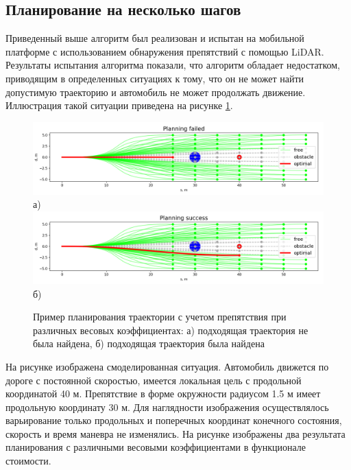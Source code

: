 \subsection{Планирование на несколько шагов}

Приведенный выше алгоритм был реализован и испытан на мобильной платформе с использованием обнаружения препятствий с
помощью LiDAR. Результаты испытания алгоритма показали, что алгоритм обладает недостатком, приводящим в определенных
ситуациях к тому, что он не может найти допустимую траекторию и автомобиль не может продолжать движение. Иллюстрация
такой ситуации приведена на рисунке \ref{img:quintic_planning_failed}.

\begin{figure}[h]
      \centering
      \includegraphics[width=\linewidth]{images/quintic_planning_failed} \\ а)
      \includegraphics[width=\linewidth]{images/quintic_planning_success} \\ б)
      \caption{Пример планирования траектории с учетом препятствия при различных весовых коэффициентах:
      а) подходящая траектория не была найдена, б) подходящая траектория была найдена}
      \label{img:quintic_planning_failed}
\end{figure}

На рисунке изображена смоделированная ситуация. Автомобиль движется по дороге с постоянной скоростью, имеется локальная
цель с продольной координатой 40 м. Препятствие в форме окружности радиусом 1.5 м имеет продольную координату 30 м.
Для наглядности изображения осуществлялось варьирование только продольных и поперечных координат конечного состояния,
скорость и время маневра не изменялись. На рисунке изображены два результата планирования с различными весовыми
коэффициентами в функционале стоимости.

